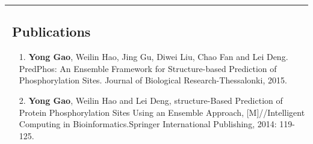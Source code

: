 \documentclass[10pt,letterpaper]{article}
\begin{document}
\hrule
\vspace{-0.4em}

\subsection*{\faBook\ Publications}

\begin{itemize}
  \parskip=0.1em

  \item [1.] \textbf{Yong Gao}, Weilin Hao, Jing Gu, Diwei Liu, Chao Fan and Lei Deng. PredPhos: An Ensemble Framework for Structure-based Prediction of Phosphorylation Sites. Journal of Biological Research-Thessalonki, 2015.
  \item [2.] \textbf{Yong Gao}, Weilin Hao and Lei Deng, structure-Based Prediction of Protein Phosphorylation Sites Using an Ensemble Approach, [M]//Intelligent Computing in Bioinformatics.Springer International Publishing, 2014: 119-125.



\end{itemize}
\end{document}
